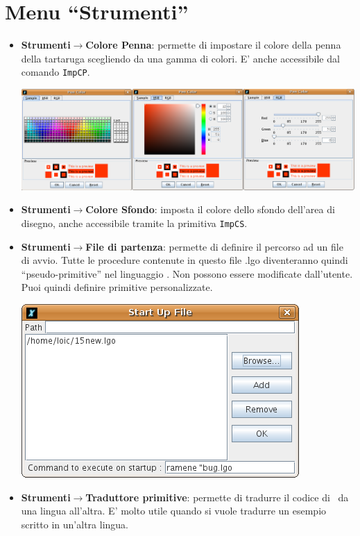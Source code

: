\section{Menu ``Strumenti''}
\begin{itemize}
	\item \textbf{Strumenti$\to$Colore Penna}: permette di impostare il colore della penna della tartaruga scegliendo da una gamma di colori. E' anche accessibile dal comando \texttt{ImpCP}.
	\begin{center}
		\includegraphics[scale=0.3]{pics/interface-CaptureColor.png}
	\end{center}
	\vspace{0.25cm}
	\item \textbf{Strumenti$\to$Colore Sfondo}: imposta il colore dello sfondo dell'area di disegno, anche accessibile tramite la primitiva \texttt{ImpCS}.
	\item \textbf{Strumenti$\to$File di partenza}: permette di definire il percorso ad un file di avvio. Tutte le procedure contenute in questo file .lgo diventeranno quindi ``pseudo-primitive'' nel linguaggio \xlogo. Non possono essere modificate dall'utente. Puoi quindi definire primitive personalizzate.
	\begin{center}
		\includegraphics[scale=0.4]{pics/interface-CaptureStart.png}
	\end{center}
	\vspace{0.25cm}
	\item \textbf{Strumenti$\to$Traduttore primitive}: permette di tradurre il codice di \xlogo\ da una lingua all'altra. E' molto utile quando si vuole tradurre un esempio scritto in un'altra lingua.

\end{itemize}
